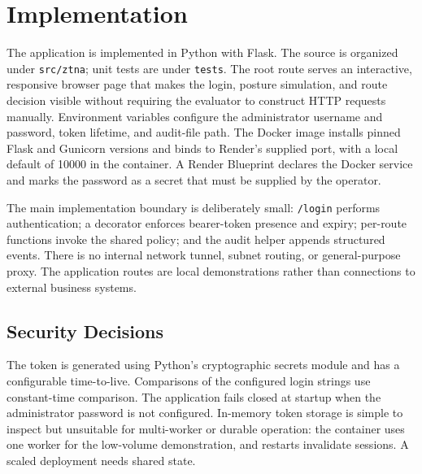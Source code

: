 \documentclass[conference]{IEEEtran}
\begin{document}
\section{Implementation}
The application is implemented in Python with Flask. The source is organized under \texttt{src/ztna}; unit tests are under \texttt{tests}. The root route serves an interactive, responsive browser page that makes the login, posture simulation, and route decision visible without requiring the evaluator to construct HTTP requests manually. Environment variables configure the administrator username and password, token lifetime, and audit-file path. The Docker image installs pinned Flask and Gunicorn versions and binds to Render's supplied port, with a local default of 10000 in the container. A Render Blueprint declares the Docker service and marks the password as a secret that must be supplied by the operator.

The main implementation boundary is deliberately small: \texttt{/login} performs authentication; a decorator enforces bearer-token presence and expiry; per-route functions invoke the shared policy; and the audit helper appends structured events. There is no internal network tunnel, subnet routing, or general-purpose proxy. The application routes are local demonstrations rather than connections to external business systems.

\subsection{Security Decisions}
The token is generated using Python's cryptographic secrets module and has a configurable time-to-live. Comparisons of the configured login strings use constant-time comparison. The application fails closed at startup when the administrator password is not configured. In-memory token storage is simple to inspect but unsuitable for multi-worker or durable operation: the container uses one worker for the low-volume demonstration, and restarts invalidate sessions. A scaled deployment needs shared state.
\end{document}
